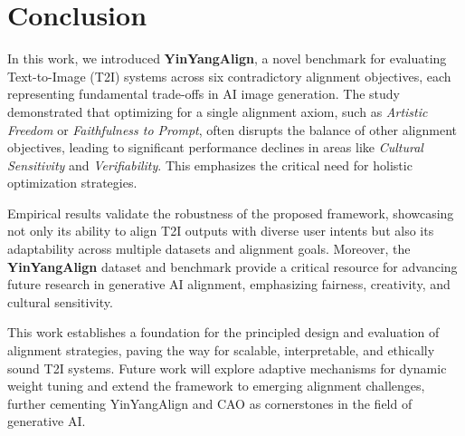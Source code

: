 


\section{Conclusion}

In this work, we introduced \textbf{YinYangAlign}, a novel benchmark for evaluating Text-to-Image (T2I) systems across six contradictory alignment objectives, each representing fundamental trade-offs in AI image generation. The study demonstrated that optimizing for a single alignment axiom, such as \emph{Artistic Freedom} or \emph{Faithfulness to Prompt}, often disrupts the balance of other alignment objectives, leading to significant performance declines in areas like \emph{Cultural Sensitivity} and \emph{Verifiability}. This emphasizes the critical need for holistic optimization strategies.


Empirical results validate the robustness of the proposed framework, showcasing not only its ability to align T2I outputs with diverse user intents but also its adaptability across multiple datasets and alignment goals. Moreover, the \textbf{YinYangAlign} dataset and benchmark provide a critical resource for advancing future research in generative AI alignment, emphasizing fairness, creativity, and cultural sensitivity.

This work establishes a foundation for the principled design and evaluation of alignment strategies, paving the way for scalable, interpretable, and ethically sound T2I systems. Future work will explore adaptive mechanisms for dynamic weight tuning and extend the framework to emerging alignment challenges, further cementing YinYangAlign and CAO as cornerstones in the field of generative AI.



